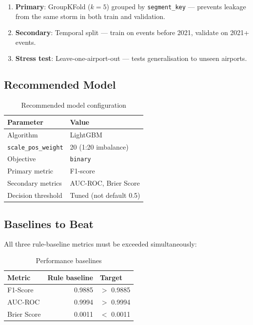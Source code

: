 \documentclass[12pt,a4paper]{article}
\begin{document}
\begin{enumerate}[leftmargin=1.5em]
  \item \textbf{Primary}: GroupKFold ($k=5$) grouped by \texttt{segment\_key} —
        prevents leakage from the same storm in both train and validation.
  \item \textbf{Secondary}: Temporal split — train on events before 2021,
        validate on 2021+ events.
  \item \textbf{Stress test}: Leave-one-airport-out — tests generalisation to unseen airports.
\end{enumerate}

\subsection{Recommended Model}

\begin{table}[H]
\centering
\caption{Recommended model configuration}
\begin{tabular}{ll}
\toprule
\textbf{Parameter} & \textbf{Value} \\
\midrule
Algorithm              & LightGBM \\
\texttt{scale\_pos\_weight} & 20 (1:20 imbalance) \\
Objective              & \texttt{binary} \\
Primary metric         & F1-score \\
Secondary metrics      & AUC-ROC, Brier Score \\
Decision threshold     & Tuned (not default 0.5) \\
\bottomrule
\end{tabular}
\end{table}

\subsection{Baselines to Beat}

All three rule-baseline metrics must be exceeded simultaneously:

\begin{table}[H]
\centering
\begin{tabular}{lrl}
\toprule
\textbf{Metric} & \textbf{Rule baseline} & \textbf{Target} \\
\midrule
F1-Score    & 0.9885 & $>$ 0.9885 \\
AUC-ROC     & 0.9994 & $>$ 0.9994 \\
Brier Score & 0.0011 & $<$ 0.0011 \\
\bottomrule
\end{tabular}
\caption{Performance baselines}
\end{table}
\end{document}
